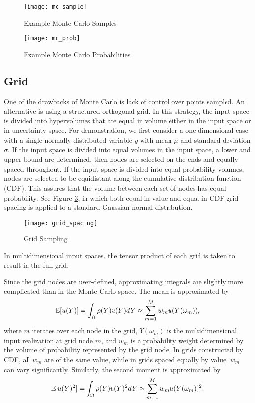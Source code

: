 \begin{figure}[H]
  \centering
  \texttt{[image: mc\_sample]}
  \caption{Example Monte Carlo Samples \cite{raven}}
  \label{fig:mc sample}
\end{figure}
\begin{figure}[H]
  \centering
  \texttt{[image: mc\_prob]}
  \caption{Example Monte Carlo Probabilities \cite{raven}}
  \label{fig:mc prob}
\end{figure}

\subsection{Grid}
One of the drawbacks of Monte Carlo is lack of control over points sampled.
An alternative is using a structured orthogonal grid.  In this strategy, the input space is
divided into hypervolumes that are equal in volume either in the input space or in uncertainty space.  For
demonstration, we first consider a one-dimensional case with a single normally-distributed variable $y$ with mean
$\mu$ and standard deviation $\sigma$.  If the input space is divided into equal volumes in the input space,
a lower and upper bound are determined,
then nodes are selected on the ends and equally spaced throughout.  If the input space is
divided into equal probability volumes, nodes are selected to be equidistant along the cumulative distribution
function (CDF).  This assures that the volume between each set of nodes has equal probability.  See Figure
\ref{fig:grid samp}, in which both equal in value and equal in CDF grid spacing is applied to a standard Gaussian
normal distribution.
\begin{figure}[htb]
  \centering
  \texttt{[image: grid\_spacing]}
  \caption{Grid Sampling}
  \label{fig:grid samp}
\end{figure}
In multidimensional input spaces, the tensor product of each grid is taken to result in the full grid.

Since the grid nodes are user-defined, approximating integrals are slightly more complicated than in the Monte
Carlo space.  The mean is approximated by
\begin{equation}
  \mathbb{E}[ u(Y)] = \int_\Omega \rho(Y) u(Y) dY \approx \sum_{m=1}^M w_m u(Y(\omega_m)),
\end{equation}
where $m$ iterates over each node in the grid, $Y(\omega_m)$ is the multidimensional input realization at grid node $m$, and
$w_m$ is a probability weight determined by the volume of probability represented by the grid node.  In grids
constructed by CDF, all $w_m$ are of the same value, while in grids spaced equally by value, $w_m$ can vary
significantly.  Similarly, the second moment is approximated by
\begin{equation}
  \mathbb{E}[ u(Y)^2] = \int_\Omega \rho(Y) u(Y)^2 dY \approx \sum_{m=1}^M w_m u(Y(\omega_m))^2.
\end{equation}

